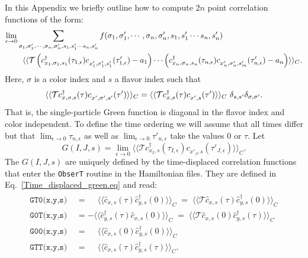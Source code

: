 In this Appendix we briefly  outline how to compute $2n$ point correlation functions   of the form: 
\begin{align}
\label{Time_dispalced_gen.eq}
	\lim_{\epsilon \rightarrow 0  } & \sum_{\sigma_1, \sigma'_1, \cdots, \sigma_n, \sigma'_n,  s_1, s'_1  \cdots s_n,  s'_n  }  f( \sigma_1, \sigma'_1, \cdots, \sigma_n, \sigma'_n,  s_1, s'_1  \cdots s_n,  s'_n ) 
	\nonumber    \\
         &  \, \, \, \,        \langle \langle {\cal T}  \left( c^{\dagger}_{x_1,\sigma_1,s_1}(\tau_{1,\epsilon}) c^{\phantom\dagger}_{x'_{1},\sigma'_1,s'_1}(\tau'_{1,\epsilon}) - a_1  \right)  \cdots 
	    \left( c^{\dagger}_{x_n,\sigma_n,s_n}(\tau_{n,\epsilon}) c^{\phantom\dagger}_{x'_{n},\sigma'_n,s'_m} (\tau'_{n,\epsilon}) - a_n  \right)   \rangle \rangle_C.
\end{align}
Here,  $ \sigma $ is a color  index and $s$ a flavor index such that 
\begin{equation}
	\langle \langle {\cal T}  c^{\dagger}_{x,\sigma,s}(\tau) c^{\phantom\dagger}_{x',\sigma',s'}(\tau')  \rangle \rangle_C  = 
	\langle \langle {\cal T}  c^{\dagger}_{x,s}(\tau) c^{\phantom\dagger}_{x',s}(\tau')  \rangle \rangle_C  \, \, \delta_{s,s'} \delta_{\sigma,\sigma'}.
\end{equation}
That is, the single-particle Green function is diagonal in the flavor index  and color  independent.   To  define the time ordering we will assume  that all times differ  but that $  \lim_{\epsilon \rightarrow 0 }    \tau_{n,\epsilon}  $   as well as $ \lim_{\epsilon \rightarrow 0 }    \tau'_{n,\epsilon} $  take the values $0$  or $\tau$.  
Let
\begin{equation}
	G(I,J,s)   =  \lim_{\epsilon \rightarrow 0 }\langle \langle   \mathcal{T}   c^{\dagger}_{x_I,s}(\tau_{I,\epsilon}) c^{\phantom\dagger}_{x'_{J},s}(\tau'_{J,\epsilon})  \rangle \rangle_{C} .
\end{equation}
The $G(I,J,s)  $  are  uniquely defined by the time-displaced correlation   functions  that enter  the \texttt{ObserT}   routine in the Hamiltonian files.  They are defined in Eq.~\eqref{Time_displaced_green.eq} and read: 
\begin{align}
\begin{aligned}
\texttt{GT0(x,y,s) }  &=   \phantom{+} \langle \langle \hat{c}^{\phantom\dagger}_{x,s} (\tau)   \hat{c}^{\dagger}_{y,s} (0)   \rangle \rangle_C \;=\; \langle \langle \mathcal{T} \hat{c}^{\phantom\dagger}_{x,s} (\tau)   \hat{c}^{\dagger}_{y,s} (0)   \rangle \rangle_C   \\
\texttt{G0T(x,y,s) }   &=  -   \langle \langle   \hat{c}^{\dagger}_{y,s} (\tau)    \hat{c}^{\phantom\dagger}_{x,s} (0)    \rangle \rangle_C \;=\;
    \langle \langle \mathcal{T} \hat{c}^{\phantom\dagger}_{x,s} (0)    \hat{c}^{\dagger}_{y,s} (\tau)   \rangle \rangle_C  \\
  \texttt{G00(x,y,s) }  &=    \phantom{+} \langle \langle \hat{c}^{\phantom\dagger}_{x,s} (0)   \hat{c}^{\dagger}_{y,s} (0)   \rangle \rangle_C    \\
    \texttt{GTT(x,y,s) }  &=   \phantom{+} \langle \langle \hat{c}^{\phantom\dagger}_{x,s} (\tau)   \hat{c}^{\dagger}_{y,s} (\tau)   \rangle \rangle_C.
\end{aligned}
\end{align}
